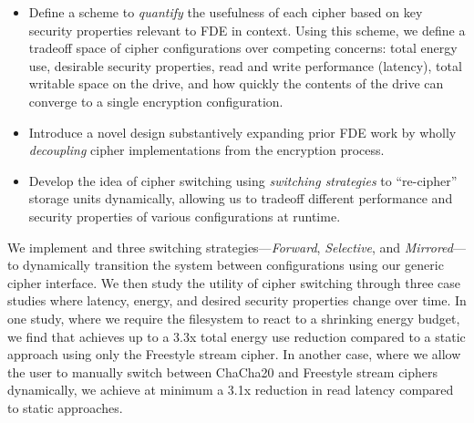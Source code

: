\begin{itemize}
  \item Define a scheme to \emph{quantify} the usefulness of each cipher based
  on key security properties relevant to FDE in context. Using this scheme, we
  define a tradeoff space of cipher configurations over competing concerns:
  total energy use, desirable security properties, read and write performance
  (latency), total writable space on the drive, and how quickly the contents of
  the drive can converge to a single encryption configuration.

  \item Introduce a novel design substantively expanding prior FDE work by
  wholly \emph{decoupling} cipher implementations from the encryption process.

  \item Develop the idea of cipher switching using \emph{switching strategies}
  to ``re-cipher'' storage units dynamically, allowing us to tradeoff different
  performance and security properties of various configurations at runtime.
\end{itemize}

We implement \sys and three switching strategies---\emph{Forward},
\emph{Selective}, and \emph{Mirrored}---to dynamically transition the system
between configurations using our generic cipher interface. We then study the
utility of cipher switching through three case studies where latency, energy,
and desired security properties change over time. In one study, where we require
the filesystem to react to a shrinking energy budget, we find that \sys
achieves up to a 3.3x total energy use reduction compared to a static approach
using only the Freestyle stream cipher. In another case, where we allow the user
to manually switch between ChaCha20 and Freestyle stream ciphers dynamically, we
achieve at minimum a 3.1x reduction in read latency compared to static
approaches.



\pagebreak




